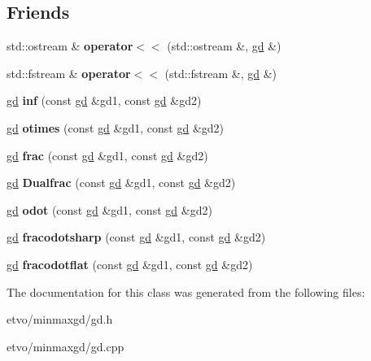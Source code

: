 \subsection*{Friends}
\begin{DoxyCompactItemize}
\item 
\mbox{\label{classmmgd_1_1gd_ae6debbf0c1df1dfa98cc657c12c878c1}} 
std\+::ostream \& {\bfseries operator$<$$<$} (std\+::ostream \&, \mbox{\hyperlink{classmmgd_1_1gd}{gd}} \&)
\item 
\mbox{\label{classmmgd_1_1gd_a2652ce1c0563883317a07fd500b1c6ff}} 
std\+::fstream \& {\bfseries operator$<$$<$} (std\+::fstream \&, \mbox{\hyperlink{classmmgd_1_1gd}{gd}} \&)
\item 
\mbox{\label{classmmgd_1_1gd_a359420ee0032329d8d8273b9fc01d0b7}} 
\mbox{\hyperlink{classmmgd_1_1gd}{gd}} {\bfseries inf} (const \mbox{\hyperlink{classmmgd_1_1gd}{gd}} \&gd1, const \mbox{\hyperlink{classmmgd_1_1gd}{gd}} \&gd2)
\item 
\mbox{\label{classmmgd_1_1gd_a673acceac37b151854972a1851d1e546}} 
\mbox{\hyperlink{classmmgd_1_1gd}{gd}} {\bfseries otimes} (const \mbox{\hyperlink{classmmgd_1_1gd}{gd}} \&gd1, const \mbox{\hyperlink{classmmgd_1_1gd}{gd}} \&gd2)
\item 
\mbox{\label{classmmgd_1_1gd_a3f4a2aa21f57e46b13660bd83cffa8c4}} 
\mbox{\hyperlink{classmmgd_1_1gd}{gd}} {\bfseries frac} (const \mbox{\hyperlink{classmmgd_1_1gd}{gd}} \&gd1, const \mbox{\hyperlink{classmmgd_1_1gd}{gd}} \&gd2)
\item 
\mbox{\label{classmmgd_1_1gd_a2dd6930af5ca5df0fcb2b684b415c72c}} 
\mbox{\hyperlink{classmmgd_1_1gd}{gd}} {\bfseries Dualfrac} (const \mbox{\hyperlink{classmmgd_1_1gd}{gd}} \&gd1, const \mbox{\hyperlink{classmmgd_1_1gd}{gd}} \&gd2)
\item 
\mbox{\label{classmmgd_1_1gd_a7f189133bc654eb0b9d129cae50b343a}} 
\mbox{\hyperlink{classmmgd_1_1gd}{gd}} {\bfseries odot} (const \mbox{\hyperlink{classmmgd_1_1gd}{gd}} \&gd1, const \mbox{\hyperlink{classmmgd_1_1gd}{gd}} \&gd2)
\item 
\mbox{\label{classmmgd_1_1gd_a4e07c2d7bbd16afdfa616eb51f368b9f}} 
\mbox{\hyperlink{classmmgd_1_1gd}{gd}} {\bfseries fracodotsharp} (const \mbox{\hyperlink{classmmgd_1_1gd}{gd}} \&gd1, const \mbox{\hyperlink{classmmgd_1_1gd}{gd}} \&gd2)
\item 
\mbox{\label{classmmgd_1_1gd_a204321412b18107581b1d547a931d1ff}} 
\mbox{\hyperlink{classmmgd_1_1gd}{gd}} {\bfseries fracodotflat} (const \mbox{\hyperlink{classmmgd_1_1gd}{gd}} \&gd1, const \mbox{\hyperlink{classmmgd_1_1gd}{gd}} \&gd2)
\end{DoxyCompactItemize}


The documentation for this class was generated from the following files\+:\begin{DoxyCompactItemize}
\item 
etvo/minmaxgd/gd.\+h\item 
etvo/minmaxgd/gd.\+cpp\end{DoxyCompactItemize}

